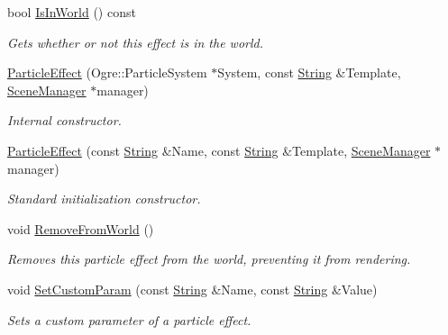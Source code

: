 \begin{DoxyCompactItemize}
bool \hyperlink{classMezzanine_1_1ParticleEffect_a6ad8b80cbe06d818a78dcff6e1069183}{IsInWorld} () const 
\begin{DoxyCompactList}\small\item\em Gets whether or not this effect is in the world. \item\end{DoxyCompactList}\item 
\hyperlink{classMezzanine_1_1ParticleEffect_a6ce060bf2f66ed82fb828ef01dcf2416}{ParticleEffect} (Ogre::ParticleSystem $\ast$System, const \hyperlink{namespaceMezzanine_acf9fcc130e6ebf08e3d8491aebcf1c86}{String} \&Template, \hyperlink{classMezzanine_1_1SceneManager}{SceneManager} $\ast$manager)
\begin{DoxyCompactList}\small\item\em Internal constructor. \item\end{DoxyCompactList}\item 
\hyperlink{classMezzanine_1_1ParticleEffect_abbc04839c173b33d1851b8061bd2b0f9}{ParticleEffect} (const \hyperlink{namespaceMezzanine_acf9fcc130e6ebf08e3d8491aebcf1c86}{String} \&Name, const \hyperlink{namespaceMezzanine_acf9fcc130e6ebf08e3d8491aebcf1c86}{String} \&Template, \hyperlink{classMezzanine_1_1SceneManager}{SceneManager} $\ast$manager)
\begin{DoxyCompactList}\small\item\em Standard initialization constructor. \item\end{DoxyCompactList}\item 
void \hyperlink{classMezzanine_1_1ParticleEffect_ac7786808910f8adcf08f2363a12ee6bd}{RemoveFromWorld} ()
\begin{DoxyCompactList}\small\item\em Removes this particle effect from the world, preventing it from rendering. \item\end{DoxyCompactList}\item 
void \hyperlink{classMezzanine_1_1ParticleEffect_a8e320ef29d8eafd48e818326b4bc43b9}{SetCustomParam} (const \hyperlink{namespaceMezzanine_acf9fcc130e6ebf08e3d8491aebcf1c86}{String} \&Name, const \hyperlink{namespaceMezzanine_acf9fcc130e6ebf08e3d8491aebcf1c86}{String} \&Value)
\begin{DoxyCompactList}\small\item\em Sets a custom parameter of a particle effect. \item\end{DoxyCompactList}\item 

\end{DoxyCompactItemize}
